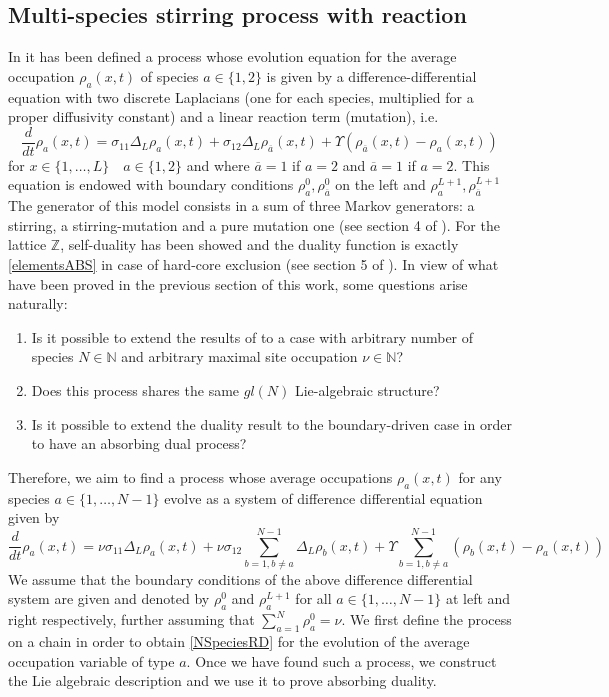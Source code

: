 \documentclass[10pt]{article}
\numberwithin{equation}{section}
\numberwithin{equation}{subsection}
\begin{document}
\subsection{Multi-species stirring process with reaction} \label{Subsection-RD}
In \cite{casini2022uphill} it has been defined a process whose evolution equation for the average occupation $\rho_{a}(x,t)$ of species $a\in \{1,2\}$ is given by a difference-differential equation with two discrete Laplacians (one for each species, multiplied for a proper diffusivity constant) and a linear reaction term (mutation), i.e.
\begin{equation}\label{2SpeciesRD}
	\frac{d}{dt} \rho_{a}(x,t)=\sigma_{11}\Delta_{L}\rho_{a}(x,t)+\sigma_{12}\Delta_{L}\rho_{\overline{a}}(x,t)+\Upsilon\left(\rho_{\overline{a}}(x,t)-\rho_{a}(x,t)\right)
\end{equation} 
for $ x\in\{1,\ldots,L\}\quad a\in\{1,2\}$  and where $\overline{a}=1$ if $a=2$ and $\overline{a}=1$ if $a=2$.
This equation is endowed with boundary conditions $\rho_{a}^{0},\rho_{\overline{a}}^{0}$ on the left and $\rho_{a}^{L+1},\rho_{\overline{a}}^{L+1}$ \\The generator of this model consists in a sum of three Markov generators: a stirring, a stirring-mutation and a pure mutation one (see section 4 of \cite{casini2022uphill}). For the lattice $\mathbb{Z}$, self-duality has been showed and the duality function is exactly \eqref{elementsABS} in case of hard-core exclusion (see section 5 of \cite{casini2022uphill}). In view of what have been proved in the previous section of this work, some questions arise naturally:
\begin{enumerate}
		\item Is it possible to extend the results of \cite{casini2022uphill} to a case with arbitrary number of species $N\in \mathbb{N}$ and arbitrary maximal site occupation $\nu\in \mathbb{N}$?
			\item Does this process shares the same $gl(N)$ Lie-algebraic structure?
	\item Is it possible to extend the duality result to the boundary-driven case in order to have an absorbing dual process?
\end{enumerate}
Therefore, we aim to find a process whose average occupations $\rho_{a}(x,t)$ for any species $a\in\{1,\ldots,N-1\}$ evolve as a system of difference differential equation given by 
\begin{equation}\label{NSpeciesRD}
	\frac{d}{dt} \rho_{a}(x,t)=\nu\sigma_{11}\Delta_{L}\rho_{a}(x,t)+\nu\sigma_{12}\sum_{b=1,b\neq a}^{N-1}\Delta_{L}\rho_{b}(x,t)+\Upsilon\sum_{b=1,b\neq a}^{N-1}\left(\rho_{b}(x,t)-\rho_{a}(x,t)\right)
\end{equation} 
 We assume that the boundary conditions of the above difference differential system are given and denoted by $\rho_{a}^{0}$ and $\rho_{a}^{L+1}$ for all $a\in\{1,\ldots,N-1\}$ at left and right respectively, further assuming that $\sum_{a=1}^{N}\rho_{a}^{0}=\nu$.
 We first define the process on a chain in order to obtain \eqref{NSpeciesRD} for the evolution of the average occupation variable of type $a$. Once we have found such a process, we construct the Lie algebraic description and we use it to prove absorbing duality.
\end{document}
